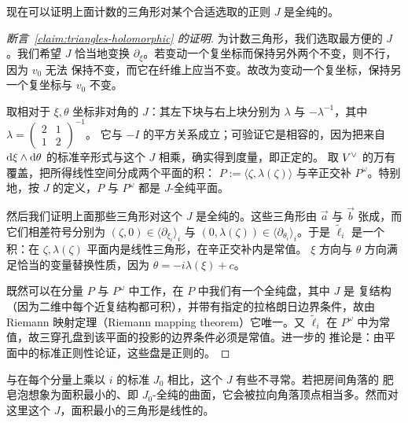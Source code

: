 现在可以证明上面计数的三角形对某个合适选取的正则 $J$ 是全纯的。

\begin{proof}[断言~\ref{claim:triangles-holomorphic} 的证明]
为计数三角形，我们选取最方便的 $J$。我们希望 $J$ 恰当地变换
$\partial_\xi$。若变动一个复坐标而保持另外两个不变，则不行，因为 $v_0$ 无法
保持不变，而它在纤维上应当不变。故改为变动一个复坐标，保持另一个复坐标与 $v_0$
不变。

取相对于 $\xi,\theta$ 坐标非对角的 $J$：其左下块与右上块分别为 $\lambda$ 与
$-\lambda^{-1}$，其中 $\lambda=\begin{pmatrix}2&1\\1&2\end{pmatrix}^{-1}$。
它与 $-I$ 的平方关系成立；可验证它是相容的，因为把来自
$\mathrm{d}\xi\wedge\mathrm{d}\theta$ 的标准辛形式与这个 $J$ 相乘，确实得到度量，即正定的。
取 $V^{\vee}$ 的万有覆盖，把所得线性空间分成两个平面的积：
$P:=\langle\zeta,\lambda(\zeta)\rangle$ 与辛正交补 $P^\omega$。特别地，按 $J$
的定义，$P$ 与 $P^\omega$ 都是 $J$-全纯平面。

然后我们证明上面那些三角形对这个 $J$ 是全纯的。这些三角形由 $\vec a$ 与
$\vec b$ 张成，而它们相差符号分别为 $(\zeta,0)\in\langle\partial_{\xi_i}\rangle_i$
与 $(0,\lambda(\zeta))\in\langle\partial_{\theta_i}\rangle_i$。于是 $\tilde\ell_i$
是一个积：在 $\zeta,\lambda(\zeta)$ 平面内是线性三角形，在辛正交补内是常值。
$\xi$ 方向与 $\theta$ 方向满足恰当的变量替换性质，因为 $\theta=-i\lambda(\xi)+c$。

既然可以在分量 $P$ 与 $P^\omega$ 中工作，在 $P$ 中我们有一个全纯盘，其中 $J$ 是
复结构（因为二维中每个近复结构都可积），并带有指定的拉格朗日边界条件，故由
Riemann 映射定理（Riemann mapping theorem）它唯一。又 $\tilde\ell_i$ 在
$P^\omega$ 中为常值，故三穿孔盘到该平面的投影的边界条件必须是常值。进一步的
推论是：由平面中的标准正则性论证，这些盘是正则的。
\end{proof}


\begin{remark}\label{rem:soap-bubble}
与在每个分量上乘以 $i$ 的标准 $J_0$ 相比，这个 $J$ 有些不寻常。若把房间角落的
肥皂泡想象为面积最小的、即 $J_0$-全纯的曲面，它会被拉向角落顶点相当多。然而对
这里这个 $J$，面积最小的三角形是线性的。
\end{remark}

